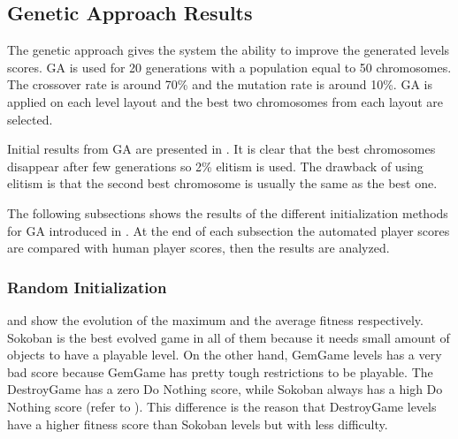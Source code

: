 \subsection{Genetic Approach Results}
The genetic approach gives the system the ability to improve the generated levels scores. GA is used for 20 generations with a population equal to 50 chromosomes. The crossover rate is around 70\% and the mutation rate is around 10\%. GA is applied on each level layout and the best two chromosomes from each layout are selected.\\\par

Initial results from GA are presented in . It is clear that the best chromosomes disappear after few generations so 2\% elitism is used. The drawback of using elitism is that the second best chromosome is usually the same as the best one.


The following subsections shows the results of the different initialization methods for GA introduced in . At the end of each subsection the automated player scores are compared with human player scores, then the results are analyzed.

\subsubsection{Random Initialization}
 and  show the evolution of the maximum and the average fitness respectively. Sokoban is the best evolved game in all of them because it needs small amount of objects to have a playable level. On the other hand, GemGame levels has a very bad score because GemGame has pretty tough restrictions to be playable. The DestroyGame has a zero Do Nothing score, while Sokoban always has a high Do Nothing score (refer to ). This difference is the reason that DestroyGame levels have a higher fitness score than Sokoban levels but with less difficulty.




